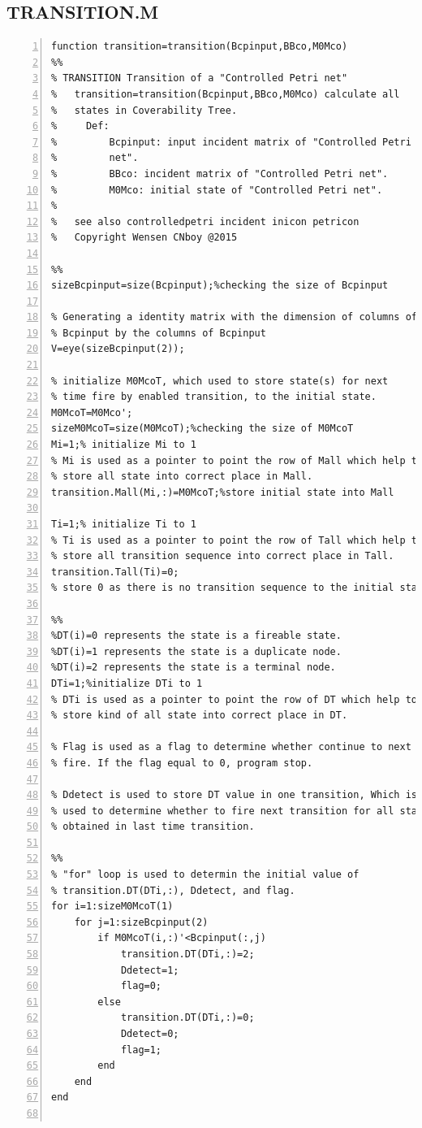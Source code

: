 \documentclass[11pt]{article}
\begin{document}
\begin{flushleft}
\section{TRANSITION.M}
\begin{lstlisting}[numbers=left]
 function transition=transition(Bcpinput,BBco,M0Mco)
%%
% TRANSITION Transition of a "Controlled Petri net"
%   transition=transition(Bcpinput,BBco,M0Mco) calculate all
%   states in Coverability Tree.
%     Def:
%         Bcpinput: input incident matrix of "Controlled Petri
%         net".
%         BBco: incident matrix of "Controlled Petri net".
%         M0Mco: initial state of "Controlled Petri net".
% 
%   see also controlledpetri incident inicon petricon
%   Copyright Wensen CNboy @2015

%%
sizeBcpinput=size(Bcpinput);%checking the size of Bcpinput

% Generating a identity matrix with the dimension of columns of
% Bcpinput by the columns of Bcpinput
V=eye(sizeBcpinput(2));

% initialize M0McoT, which used to store state(s) for next
% time fire by enabled transition, to the initial state.
M0McoT=M0Mco';
sizeM0McoT=size(M0McoT);%checking the size of M0McoT
Mi=1;% initialize Mi to 1
% Mi is used as a pointer to point the row of Mall which help to
% store all state into correct place in Mall.
transition.Mall(Mi,:)=M0McoT;%store initial state into Mall

Ti=1;% initialize Ti to 1
% Ti is used as a pointer to point the row of Tall which help to
% store all transition sequence into correct place in Tall.
transition.Tall(Ti)=0;
% store 0 as there is no transition sequence to the initial state

%%
%DT(i)=0 represents the state is a fireable state.
%DT(i)=1 represents the state is a duplicate node.
%DT(i)=2 represents the state is a terminal node.
DTi=1;%initialize DTi to 1
% DTi is used as a pointer to point the row of DT which help to
% store kind of all state into correct place in DT.

% Flag is used as a flag to determine whether continue to next
% fire. If the flag equal to 0, program stop.

% Ddetect is used to store DT value in one transition, Which is
% used to determine whether to fire next transition for all state
% obtained in last time transition.

%%
% "for" loop is used to determin the initial value of
% transition.DT(DTi,:), Ddetect, and flag.
for i=1:sizeM0McoT(1)
    for j=1:sizeBcpinput(2)
        if M0McoT(i,:)'<Bcpinput(:,j)
            transition.DT(DTi,:)=2;
            Ddetect=1;
            flag=0;
        else
            transition.DT(DTi,:)=0;
            Ddetect=0;
            flag=1;
        end
    end
end


\end{lstlisting}
\end{flushleft}
\end{document}
